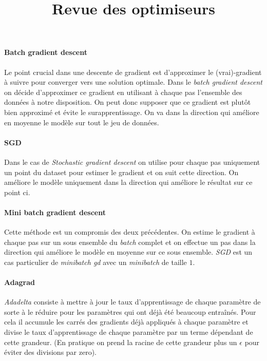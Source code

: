 \documentclass[french]{article}
\title{Revue des optimiseurs}
\date{}
\begin{document}
	\maketitle
	\paragraph*{Batch gradient descent}
	
	Le point crucial dans une descente de gradient est d'approximer le (vrai)-gradient à suivre pour converger vers une solution optimale. Dans le \emph{batch gradient descent} on décide d'approximer ce gradient en utilisant à chaque pas l'ensemble des données à notre disposition. On peut donc supposer que ce gradient est plutôt bien approximé et évite le surapprentissage. On va dans la direction qui améliore en moyenne le modèle sur tout le jeu de données.
	
	\paragraph*{SGD}
	
	Dans le cas de \emph{Stochastic gradient descent} on utilise pour chaque pas uniquement un point du dataset pour estimer le gradient et on suit cette direction. On améliore le modèle uniquement dans la direction qui améliore le résultat sur ce point ci.
	
	\paragraph*{Mini batch gradient descent}
	
	Cette méthode est un compromis des deux précédentes. On estime le gradient à chaque pas sur un sous ensemble du \emph{batch} complet et on effectue un pas dans la direction qui améliore le modèle en moyenne sur ce sous ensemble. \emph{SGD} est un cas particulier de \emph{minibatch gd} avec un \emph{minibatch} de taille $1$.
	
	\paragraph*{Adagrad}
	
	\emph{Adadelta} consiste à mettre à jour le taux d'apprentissage de chaque paramètre de sorte à le réduire pour les paramètres qui ont déjà été beaucoup entraînés. Pour cela il accumule les carrés des gradients déjà appliqués à chaque paramètre et divise le taux d'apprentissage de chaque paramètre par un terme dépendant de cette grandeur. (En pratique on prend la racine de cette grandeur plus un $\epsilon$ pour éviter des divisions par zero).
	
\end{document}
